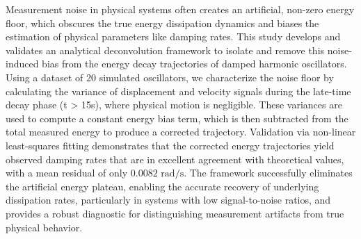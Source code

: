 \documentclass[]{article}
\begin{document}
Measurement noise in physical systems often creates an artificial, non-zero energy floor, which obscures the true energy dissipation dynamics and biases the estimation of physical parameters like damping rates. This study develops and validates an analytical deconvolution framework to isolate and remove this noise-induced bias from the energy decay trajectories of damped harmonic oscillators. Using a dataset of 20 simulated oscillators, we characterize the noise floor by calculating the variance of displacement and velocity signals during the late-time decay phase (t > 15s), where physical motion is negligible. These variances are used to compute a constant energy bias term, which is then subtracted from the total measured energy to produce a corrected trajectory. Validation via non-linear least-squares fitting demonstrates that the corrected energy trajectories yield observed damping rates that are in excellent agreement with theoretical values, with a mean residual of only $0.0082 \text{ rad/s}$. The framework successfully eliminates the artificial energy plateau, enabling the accurate recovery of underlying dissipation rates, particularly in systems with low signal-to-noise ratios, and provides a robust diagnostic for distinguishing measurement artifacts from true physical behavior.
\end{document}
